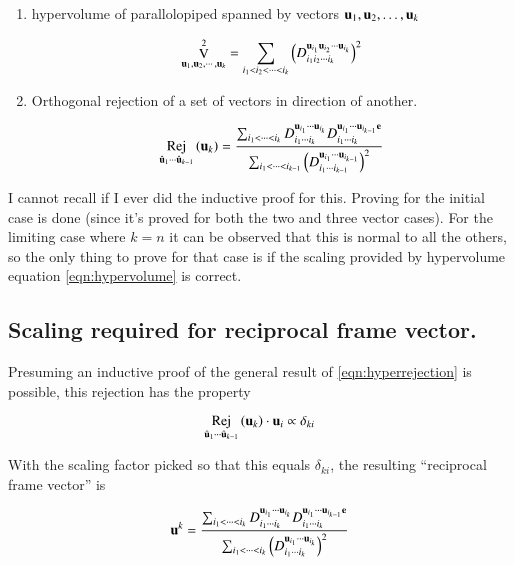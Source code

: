 \documentclass{article}      %
\DeclareMathOperator{\RejName}{Rej}
\newcommand{\Rej}[2]{\RejName_{#1}\left( {#2} \right)}
\DeclareMathOperator{\VName}{V}
\newcommand{\VolumeOp}[1]{\VName_{#1}}
\begin{document}
\begin{enumerate}
\item hypervolume of parallolopiped spanned by vectors $\mathbf{u}_1, \mathbf{u}_2, \dots, \mathbf{u}_k$

\begin{equation} \label{eqn:hypervolume}
\VolumeOp{\Bu_1, \Bu_2, \cdots, \Bu_k}^2
=
\sum_{i_1 < i_2 < \cdots < i_k } \left(
D_{i_1 i_2 \cdots i_k}^{\Bu_{i_1} \Bu_{i_2} \cdots \Bu_{i_k}}
\right)^2
\end{equation}

\item Orthogonal rejection of a set of vectors in direction of another.

\begin{equation} \label{eqn:hyperrejection}
\Rej{\ucap_1\cdots\ucap_{k-1}}{\Bu_k} = 
\frac{
\sum_{i_1 < \cdots < i_{k} } 
D_{i_1 \cdots i_{k}}^{\Bu_{i_1} \cdots \Bu_{i_{k}}}
D_{i_1 \cdots i_{k}}^{\Bu_{i_1} \cdots \Bu_{i_{k-1}} \Be }}
{
\sum_{i_1 < \cdots < i_{k-1} } \left(D_{i_1 \cdots i_{k-1}}^{\Bu_{i_1} \cdots \Bu_{i_{k-1}}}\right)^2
}
\end{equation}
\end{enumerate}

I cannot recall if I ever did the inductive proof for this.
Proving for the initial case is done (since it's proved for both the 
two and three vector cases).  For the limiting case where $k=n$ it can be observed that this is normal to all the others, so the
only thing to prove for that case is if the scaling provided by hypervolume equation \ref{eqn:hypervolume} is correct.

\subsection{ Scaling required for reciprocal frame vector. }

Presuming an inductive proof of the general result of \ref{eqn:hyperrejection} is possible, this rejection
has the property

\begin{equation*}
\Rej{\ucap_1\cdots\ucap_{k-1}}{\Bu_k} \cdot \Bu_i \propto \delta_{ki}
\end{equation*}

With the scaling factor picked so that this equals $\delta_{ki}$, the resulting ``reciprocal frame vector'' is

\begin{equation} \label{eqn:framevec}
\mathbf{u}^k =
\frac{
\sum_{i_1 < \cdots < i_{k} } 
D_{i_1 \cdots i_{k}}^{\mathbf{u}_{i_1} \cdots \mathbf{u}_{i_{k}}}
D_{i_1 \cdots i_{k}}^{\mathbf{u}_{i_1} \cdots \mathbf{u}_{i_{k-1}} \mathbf{e} }}
{
\sum_{i_1 < \cdots < i_{k} } \left(D_{i_1 \cdots i_{k}}^{\mathbf{u}_{i_1} \cdots \mathbf{u}_{i_{k}}}\right)^2
}
\end{equation}
\end{document}
